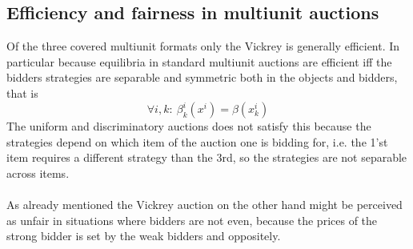 \subsection{Efficiency and fairness in multiunit auctions}
Of the three covered multiunit formats only the Vickrey is generally efficient. In particular because equilibria in standard multiunit auctions are efficient iff the bidders strategies are separable and symmetric both in the objects and bidders, that is 
\begin{equation}
\forall i,k : \ \beta_k^i(x^i) = \beta(x_k^i)
\end{equation}
The uniform and discriminatory auctions does not satisfy this because the strategies depend on which item of the auction one is bidding for, i.e. the 1'st item requires a different strategy than the 3rd, so the strategies are not separable across items. 
\\ \\
As already mentioned the Vickrey auction on the other hand might be perceived as unfair in situations where bidders are not even, because the prices of the strong bidder is set by the weak bidders and oppositely. 